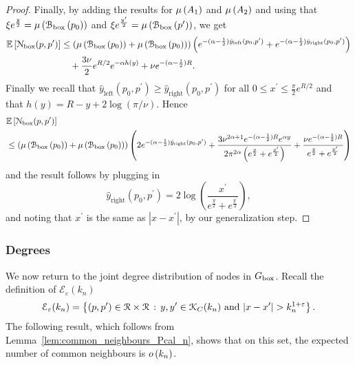 \begin{proof}
Finally, by adding the results for $\mu\left(A_1\right)$ and $\mu\left(A_2\right)$ and using that $\xi e^{\frac{y}{2}} = \mu\left({\mathcal B}_{\text{box}}\left(p_0\right)\right)$ and 
$\xi e^{\frac{y^\prime}{2}} = \mu\left({\mathcal B}_{\text{box}}\left(p^\prime\right)\right)$, we get
\begin{align*}
	\mathbb{E}\left[{\mathcal N}_{\text{box}}(p,p^\prime)\right] 
	&\le \left(\mu\left({\mathcal B}_{\text{box}}\left(p_0\right)\right) + \mu\left({\mathcal B}_{\text{box}}\left(p_0\right)\right) \right)
		\left(e^{-(\alpha - \frac{1}{2})\hat{y}_{\text{left}}(p_0,p^\prime)}
		+ e^{-(\alpha - \frac{1}{2})\hat{y}_{\text{right}}(p_0,p^\prime)} \right) \\
	&\hspace{10pt}+ \frac{3\nu}{2}e^{R/2} e^{-\alpha h(y)}
		+ \nu e^{-(\alpha -\frac{1}{2}) R}.
\end{align*}
Finally we recall that $\hat{y}_{\text{left}}(p_0,p^\prime) \ge \hat{y}_{\text{right}}(p_0,p^\prime)$ for all $0 \le x^\prime \le \frac{\pi}{2}e^{R/2}$ and that $h(y) = R - y + 2\log(\pi/\nu)$. Hence
\begin{align*}
	&\mathbb{E}\left[{\mathcal N}_{\text{box}}(p,p^\prime)\right] \\
	&\le \left(\mu\left({\mathcal B}_{\text{box}}\left(p_0\right)\right) + \mu\left({\mathcal B}_{\text{box}}\left(p_0\right)\right) \right) 
		\left(2e^{-(\alpha - \frac{1}{2})\hat{y}_{\text{right}}(p_0,p^\prime)} +    
		\frac{3 \nu^{2\alpha + 1}e^{-(\alpha - \frac{1}{2})R} e^{\alpha y}}{2 \pi^{2\alpha}\left(
		e^{\frac{y}{2}} + e^{\frac{y^\prime}{2}}\right)}
		+ \frac{\nu e^{-(\alpha - \frac{1}{2})R}}{e^{\frac{y}{2}} + e^{\frac{y^\prime}{2}}}
		\right)
\end{align*}
and the result follows by plugging in 
\[
	\hat{y}_{\text{right}}(p_0,p^\prime) = 2 \log\left(\frac{x^\prime}{e^{\frac{y}{2}} + e^{\frac{y^\prime}{2}}}\right),
\]
and noting that $x^\prime$ is the same as $|x - x^\prime|$, by our generalization step.

\end{proof} 

\subsubsection*{Degrees}

We now return to the joint degree distribution of nodes in $G_{\text{box}}$. Recall the definition of $\mathcal{E}_\varepsilon(k_n)$
\[
	\mathcal{E}_{\varepsilon}(k_n) = \left\{(p,p^\prime) \in {\mathcal R} \times {\mathcal R}
			\, : \, y,y^\prime \in {\mathcal K}_{C}(k_n) \text{ and } |x - x^\prime| > k_n^{1 + \varepsilon} \right\}. 
\]
The following result, which follows from Lemma~\ref{lem:common_neighbours_Pcal_n}, shows that on this set, the expected number of common neighbours is $o\left(k_n\right)$.


